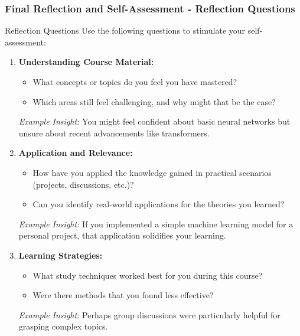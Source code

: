 \documentclass[aspectratio=169]{beamer}
\begin{document}
\begin{frame}[fragile]
    \frametitle{Final Reflection and Self-Assessment - Reflection Questions}
    \begin{block}{Reflection Questions}
        Use the following questions to stimulate your self-assessment:
        \begin{enumerate}
            \item \textbf{Understanding Course Material:}
            \begin{itemize}
                \item What concepts or topics do you feel you have mastered?
                \item Which areas still feel challenging, and why might that be the case?
            \end{itemize}
            \textit{Example Insight:} You might feel confident about basic neural networks but unsure about recent advancements like transformers.

            \item \textbf{Application and Relevance:}
            \begin{itemize}
                \item How have you applied the knowledge gained in practical scenarios (projects, discussions, etc.)?
                \item Can you identify real-world applications for the theories you learned?
            \end{itemize}
            \textit{Example Insight:} If you implemented a simple machine learning model for a personal project, that application solidifies your learning.

            \item \textbf{Learning Strategies:}
            \begin{itemize}
                \item What study techniques worked best for you during this course?
                \item Were there methods that you found less effective?
            \end{itemize}
            \textit{Example Insight:} Perhaps group discussions were particularly helpful for grasping complex topics.
        \end{enumerate}
    \end{block}
\end{frame}
\end{document}
